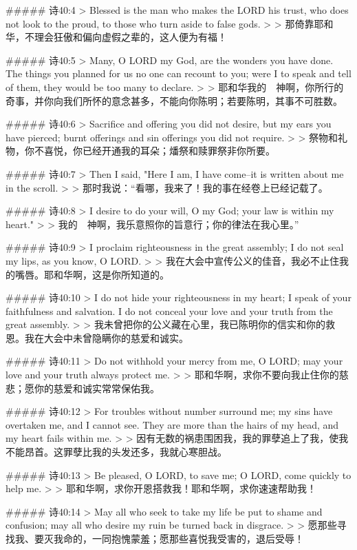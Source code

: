 ##### 诗40:4
> Blessed is the man who makes the LORD his trust, who does not look to the proud, to those who turn aside to false gods.
>
> 那倚靠耶和华，不理会狂傲和偏向虚假之辈的，这人便为有福！


##### 诗40:5
> Many, O LORD my God, are the wonders you have done. The things you planned for us no one can recount to you; were I to speak and tell of them, they would be too many to declare.
>
> 耶和华我的　神啊，你所行的奇事，并你向我们所怀的意念甚多，不能向你陈明；若要陈明，其事不可胜数。


##### 诗40:6
> Sacrifice and offering you did not desire, but my ears you have pierced; burnt offerings and sin offerings you did not require.
>
> 祭物和礼物，你不喜悦，你已经开通我的耳朵；燔祭和赎罪祭非你所要。


##### 诗40:7
> Then I said, "Here I am, I have come--it is written about me in the scroll.
>
> 那时我说：“看哪，我来了！我的事在经卷上已经记载了。


##### 诗40:8
> I desire to do your will, O my God; your law is within my heart."
>
> 我的　神啊，我乐意照你的旨意行；你的律法在我心里。”


##### 诗40:9
> I proclaim righteousness in the great assembly; I do not seal my lips, as you know, O LORD.
>
> 我在大会中宣传公义的佳音，我必不止住我的嘴唇。耶和华啊，这是你所知道的。


##### 诗40:10
> I do not hide your righteousness in my heart; I speak of your faithfulness and salvation. I do not conceal your love and your truth from the great assembly.
>
> 我未曾把你的公义藏在心里，我已陈明你的信实和你的救恩。我在大会中未曾隐瞒你的慈爱和诚实。


##### 诗40:11
> Do not withhold your mercy from me, O LORD; may your love and your truth always protect me.
>
> 耶和华啊，求你不要向我止住你的慈悲；愿你的慈爱和诚实常常保佑我。


##### 诗40:12
> For troubles without number surround me; my sins have overtaken me, and I cannot see. They are more than the hairs of my head, and my heart fails within me.
>
> 因有无数的祸患围困我，我的罪孽追上了我，使我不能昂首。这罪孽比我的头发还多，我就心寒胆战。


##### 诗40:13
> Be pleased, O LORD, to save me; O LORD, come quickly to help me.
>
> 耶和华啊，求你开恩搭救我！耶和华啊，求你速速帮助我！


##### 诗40:14
> May all who seek to take my life be put to shame and confusion; may all who desire my ruin be turned back in disgrace.
>
> 愿那些寻找我、要灭我命的，一同抱愧蒙羞；愿那些喜悦我受害的，退后受辱！


